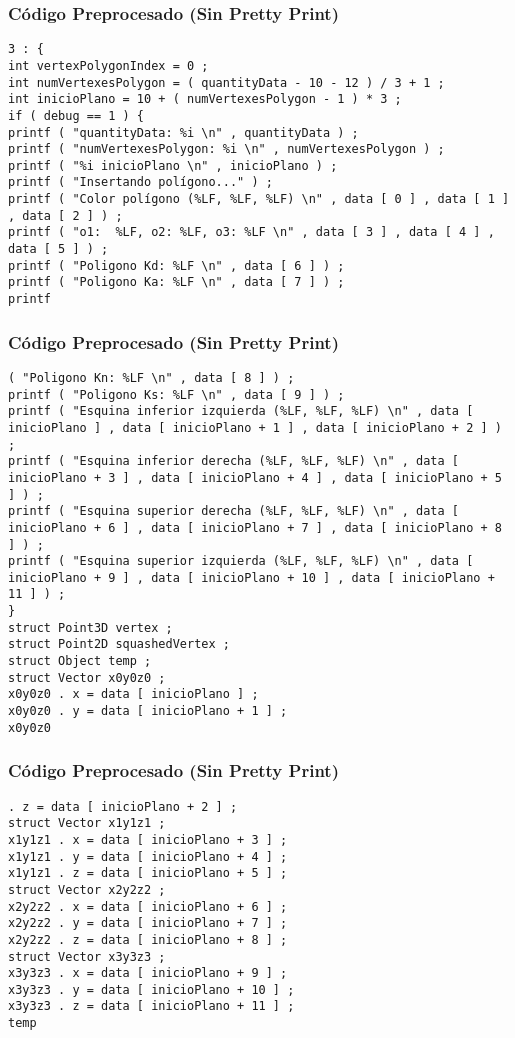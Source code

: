 \documentclass{beamer}
\begin{document}
\begin{frame}[fragile]
\frametitle{C\'odigo Preprocesado (Sin Pretty Print)}
\begin{lstlisting}[style=CStyle]
3 : { 
int vertexPolygonIndex = 0 ; 
int numVertexesPolygon = ( quantityData - 10 - 12 ) / 3 + 1 ; 
int inicioPlano = 10 + ( numVertexesPolygon - 1 ) * 3 ; 
if ( debug == 1 ) { 
printf ( "quantityData: %i \n" , quantityData ) ; 
printf ( "numVertexesPolygon: %i \n" , numVertexesPolygon ) ; 
printf ( "%i inicioPlano \n" , inicioPlano ) ; 
printf ( "Insertando polígono..." ) ; 
printf ( "Color polígono (%LF, %LF, %LF) \n" , data [ 0 ] , data [ 1 ] , data [ 2 ] ) ; 
printf ( "o1:  %LF, o2: %LF, o3: %LF \n" , data [ 3 ] , data [ 4 ] , data [ 5 ] ) ; 
printf ( "Poligono Kd: %LF \n" , data [ 6 ] ) ; 
printf ( "Poligono Ka: %LF \n" , data [ 7 ] ) ; 
printf \end{lstlisting}
\end{frame}
\begin{frame}[fragile]
\frametitle{C\'odigo Preprocesado (Sin Pretty Print)}
\begin{lstlisting}[style=CStyle]
( "Poligono Kn: %LF \n" , data [ 8 ] ) ; 
printf ( "Poligono Ks: %LF \n" , data [ 9 ] ) ; 
printf ( "Esquina inferior izquierda (%LF, %LF, %LF) \n" , data [ inicioPlano ] , data [ inicioPlano + 1 ] , data [ inicioPlano + 2 ] ) ; 
printf ( "Esquina inferior derecha (%LF, %LF, %LF) \n" , data [ inicioPlano + 3 ] , data [ inicioPlano + 4 ] , data [ inicioPlano + 5 ] ) ; 
printf ( "Esquina superior derecha (%LF, %LF, %LF) \n" , data [ inicioPlano + 6 ] , data [ inicioPlano + 7 ] , data [ inicioPlano + 8 ] ) ; 
printf ( "Esquina superior izquierda (%LF, %LF, %LF) \n" , data [ inicioPlano + 9 ] , data [ inicioPlano + 10 ] , data [ inicioPlano + 11 ] ) ; 
} 
struct Point3D vertex ; 
struct Point2D squashedVertex ; 
struct Object temp ; 
struct Vector x0y0z0 ; 
x0y0z0 . x = data [ inicioPlano ] ; 
x0y0z0 . y = data [ inicioPlano + 1 ] ; 
x0y0z0 \end{lstlisting}
\end{frame}
\begin{frame}[fragile]
\frametitle{C\'odigo Preprocesado (Sin Pretty Print)}
\begin{lstlisting}[style=CStyle]
. z = data [ inicioPlano + 2 ] ; 
struct Vector x1y1z1 ; 
x1y1z1 . x = data [ inicioPlano + 3 ] ; 
x1y1z1 . y = data [ inicioPlano + 4 ] ; 
x1y1z1 . z = data [ inicioPlano + 5 ] ; 
struct Vector x2y2z2 ; 
x2y2z2 . x = data [ inicioPlano + 6 ] ; 
x2y2z2 . y = data [ inicioPlano + 7 ] ; 
x2y2z2 . z = data [ inicioPlano + 8 ] ; 
struct Vector x3y3z3 ; 
x3y3z3 . x = data [ inicioPlano + 9 ] ; 
x3y3z3 . y = data [ inicioPlano + 10 ] ; 
x3y3z3 . z = data [ inicioPlano + 11 ] ; 
temp \end{lstlisting}
\end{frame}
\end{document}
